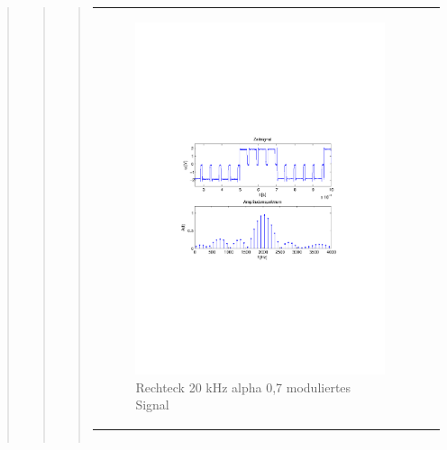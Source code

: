 \begin{quote}
\begin{quote}
\begin{quote}
\begin{center}
\begin{tabular}{ll}
                \begin{minipage}{0.6\textwidth}
                    \begin{figure}[H]
                        \includegraphics[scale=0.7, trim = 35mm 100mm 35mm 95mm, clip]{Bilder/flatrec20_07abget_zeit}
                       \caption{Rechteck 20 kHz alpha 0,7 moduliertes Signal}
		              \label{fig:flatrec20_07zeit}
                    \end{figure}
                \end{minipage}
            
            \end{tabular}
            \end{center}
            
            \begin{center}
            \begin{tabular}{ll}
            

\end{tabular}
\end{center}
\end{quote}
\end{quote}
\end{quote}
